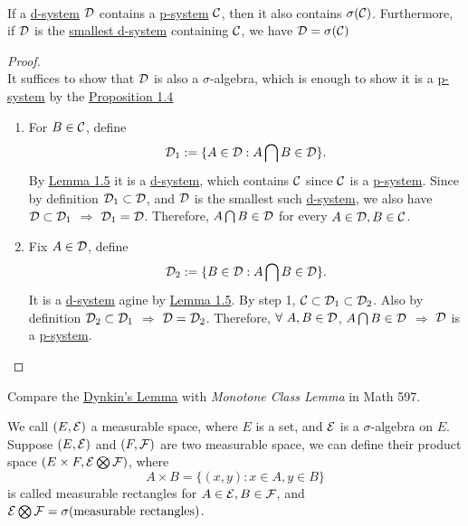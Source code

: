 \begin{theorem}\label{Dynkin's lemma}\ \\
If a \underline{d-system} $\mathcal{D}$ contains a \underline{p-system} $\mathcal{C}$, then it also contains $\sigma(\mathcal{C})$. Furthermore, if $\mathcal{D}$ is the \underline{smallest d-system} containing $\mathcal{C}$, we have $\mathcal{D}  = \sigma(\mathcal{C})$
\end{theorem}
\begin{proof}\ \\
It suffices to show that $\mathcal{D}$ is also a $\sigma$-algebra, which is enough   to show it is a \underline{p-system} by the \hyperref[1.4]{Proposition 1.4}
\begin{enumerate}[label = (\arabic*)]
    \item For $B \in \mathcal{C}$, define
    \begin{equation*}
        \mathcal{D}_1 := \{A \in \mathcal{D}: A \bigcap B \in \mathcal{D}\}.
    \end{equation*}
    By \hyperref[1.5]{Lemma 1.5} it is a \underline{d-system}, which contains $\mathcal{C}$ since $\mathcal{C}$ is a \underline{p-system}. Since by definition $\mathcal{D}_1 \subset \mathcal{D}$, and $\mathcal{D}$ is the smallest such \underline{d-system}, we also have $\mathcal{D} \subset \mathcal{D}_1$ $\Rightarrow$ $\mathcal{D}_1 = \mathcal{D}$. Therefore, $A \bigcap B \in \mathcal{D}$ for every $A \in \mathcal{D}, B \in \mathcal{C}$.
    \item Fix $A \in \mathcal{D}$, define
    \begin{equation*}
        \mathcal{D}_2 := \{B \in \mathcal{D}: A \bigcap B \in \mathcal{D}\}.
    \end{equation*}
    It is a \underline{d-system} agine by \hyperref[1.5]{Lemma 1.5}. By step 1, $\mathcal{C} \subset \mathcal{D}_1 \subset \mathcal{D}_2$. Also by definition $\mathcal{D}_2 \subset \mathcal{D}_1$ $\Rightarrow$ $\mathcal{D} = \mathcal{D}_2$. Therefore, $\forall\ A,B \in \mathcal{D}$, $A \bigcap B \in \mathcal{D}$ $\Rightarrow$ $\mathcal{D}$ is a \underline{p-system}.
\end{enumerate}
\end{proof}
\begin{remark}
Compare the \hyperref[Dynkin's lemma]{Dynkin's Lemma} with \textit{Monotone Class Lemma} in Math 597.    
\end{remark}

\np We call $(E, \mathcal{E})$ a measurable space, where $E$ is a set, and $\mathcal{E}$ is a $\sigma$-algebra on $E$. Suppose $(E,\mathcal{E})$ and $(F, \mathcal{F})$ are two measurable space, we can define their product space $(E \times F, \mathcal{E} \bigotimes \mathcal{F})$, where $$A \times B = \{(x,y): x \in A, y \in B\}$$
is called measurable rectangles for $A \in \mathcal{E}, B \in \mathcal{F}$, and $\mathcal{E} \bigotimes \mathcal{F} = \sigma(\text{measurable rectangles})$.



